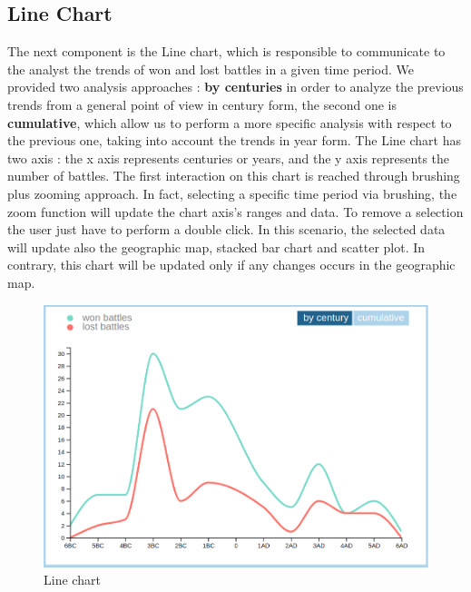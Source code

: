 \subsection{Line Chart}
The next component is the Line chart, which is responsible to communicate to the analyst the trends of won and lost battles in a given time period. We provided two analysis approaches : \textbf{by centuries} in order to analyze the previous trends from a general point of view in century form, the second one is \textbf{cumulative}, which allow us to perform a more specific analysis with respect to the previous one, taking into account the trends in year form. The Line chart has two axis : the x axis represents centuries or years, and the y axis represents the number of battles. The first interaction on this chart is reached through brushing plus zooming approach. In fact, selecting a specific time period via brushing, the zoom function will update the chart axis's ranges and data. To remove a selection the user just have to perform a double click. In this scenario, the selected data will update also the geographic map, stacked bar chart and scatter plot. In contrary, this chart will be updated only if any changes occurs in the geographic map.
\begin{figure}[h]
\centering
\includegraphics[scale=0.20]{./images/line_chart.png}
\caption{Line chart}
\end{figure}

